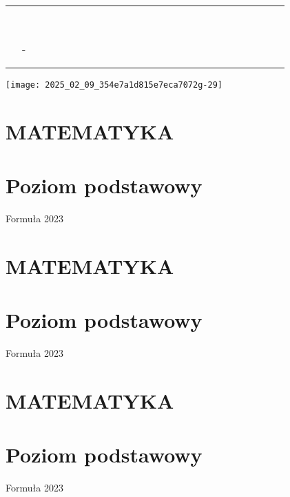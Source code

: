 \documentclass[10pt]{article}
\begin{document}
\begin{center}
\begin{tabular}{|c|c|c|c|c|c|c|c|c|c|c|c|c|c|c|c|c|c|c|c|c|c|c|c|c|}
\hline
 &  &  &  &  &  &  &  &  &  &  &  &  &  &  &  &  &  &  &  &  &  &  &  &  \\
\hline
 &  &  &  &  &  &  &  &  &  &  &  &  &  &  &  &  &  &  &  &  &  &  &  &  \\
\hline
 &  &  &  &  &  &  &  &  &  &  &  &  &  &  &  &  &  &  &  &  &  &  &  &  \\
\hline
 &  &  &  &  &  &  &  &  &  &  &  &  &  &  &  &  &  &  &  &  &  &  &  &  \\
\hline
 &  &  &  &  &  &  &  &  &  &  &  &  &  &  &  &  &  &  &  &  &  &  &  &  \\
\hline
 &  &  &  &  &  &  &  &  &  &  &  &  &  &  &  &  &  &  &  &  &  &  &  &  \\
\hline
 &  &  &  &  &  &  &  &  &  &  &  &  &  &  &  &  &  &  &  &  &  &  &  &  \\
\hline
 &  &  &  &  &  &  &  &  &  &  &  &  &  &  &  &  &  &  &  &  &  &  &  &  \\
\hline
 &  &  &  &  &  &  &  &  &  &  &  &  &  &  &  &  &  &  &  &  &  &  &  &  \\
\hline
 & - &  &  &  &  &  &  &  &  &  &  &  &  &  &  &  &  &  &  &  &  &  &  &  \\
\hline
 &  &  &  &  &  &  &  &  &  &  &  &  &  &  &  &  &  &  &  &  &  &  &  &  \\
\hline
 &  &  &  &  &  &  &  &  &  &  &  &  &  &  &  &  &  &  &  &  &  &  &  &  \\
\hline
\end{tabular}
\end{center}

\begin{center}
\texttt{[image: 2025\_02\_09\_354e7a1d815e7eca7072g-29]}
\end{center}

\section*{MATEMATYKA}
\section*{Poziom podstawowy}
Formuła 2023

\section*{MATEMATYKA}
\section*{Poziom podstawowy}
Formuła 2023

\section*{MATEMATYKA}
\section*{Poziom podstawowy}
Formuła 2023
\end{document}
